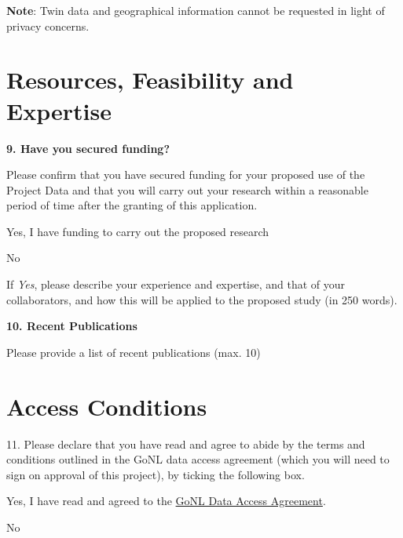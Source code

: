 \documentclass[a4paper,12pt]{article}
\begin{document}
\begin{Form}
\textbf{Note}: Twin data and geographical information cannot be requested in light of privacy concerns.

\section*{Resources, Feasibility and Expertise}

\textbf{9. Have you secured funding?}

Please confirm that you have secured funding for your proposed use of the Project Data and that you will carry out your research within a reasonable period of time after the granting of this application.

 Yes, I have funding to carry out the proposed research

 No

If \emph{Yes}, please describe your experience and expertise, and that of your collaborators, and how this will be applied to the proposed study (in 250 words).

\TextField[name=resourcesExperience,multiline=true,height=9\baselineskip]{}

\newpage

\textbf{10. Recent Publications}

Please provide a list of recent publications (max. 10)

\TextField[name=publications,multiline=true,height=38\baselineskip]{}

\section*{Access Conditions}

11. Please declare that you have read and agree to abide by the terms and conditions outlined in the GoNL data access agreement (which you will need to sign on approval of this project), by ticking the following box.

 Yes, I have read and agreed to the \href{https://nlgenome.nl/api/files/aaaac6lzvpcop6qwh32jd7yaae?alt=media}{GoNL Data Access Agreement}.

 No

\end{Form}
\end{document}
